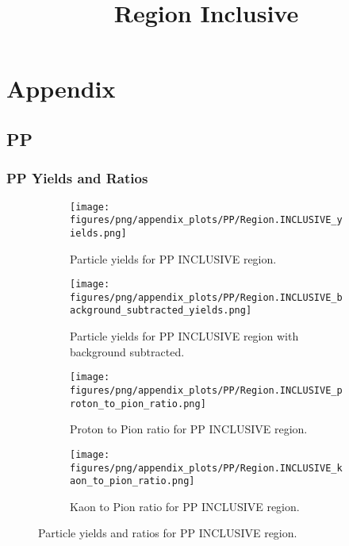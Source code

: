 \chapter{Appendix}

        \section{PP}
        
                \subsection{PP Yields and Ratios}
                \begin{figure}[H]
                    \title{Region Inclusive}
                    \begin{subfigure}[b]{0.5\textwidth}
                        \centering
                        \texttt{[image: figures/png/appendix\_plots/PP/Region.INCLUSIVE\_yields.png]}
                        \caption{Particle yields for PP INCLUSIVE region.}
                        \label{fig:appendix_PP_INCLUSIVE_Inclusive_Yields}
                    \end{subfigure}
                    \begin{subfigure}[b]{0.5\textwidth}
                        \centering
                        \texttt{[image: figures/png/appendix\_plots/PP/Region.INCLUSIVE\_background\_subtracted\_yields.png]}
                        \caption{Particle yields for PP INCLUSIVE region with background subtracted.}
                        \label{fig:appendix_PP_INCLUSIVE_Inclusive_Yields_Background_Subtracted}
                    \end{subfigure}
                    \begin{subfigure}[b]{0.5\textwidth}
                        \centering
                        \texttt{[image: figures/png/appendix\_plots/PP/Region.INCLUSIVE\_proton\_to\_pion\_ratio.png]}
                        \caption{Proton to Pion ratio for PP INCLUSIVE region.}
                        \label{fig:appendix_PP_INCLUSIVE_Proton_to_Pion_Ratio}
                    \end{subfigure}
                    \begin{subfigure}[b]{0.5\textwidth}
                        \centering
                        \texttt{[image: figures/png/appendix\_plots/PP/Region.INCLUSIVE\_kaon\_to\_pion\_ratio.png]}
                        \caption{Kaon to Pion ratio for PP INCLUSIVE region.}
                        \label{fig:appendix_PP_INCLUSIVE_Kaon_to_Pion_Ratio}
                    \end{subfigure}
                    \caption{Particle yields and ratios for PP INCLUSIVE region.}
                    \label{fig:appendix_PP_INCLUSIVE_Inclusive_Yields_and_Ratios}
                \end{figure}
